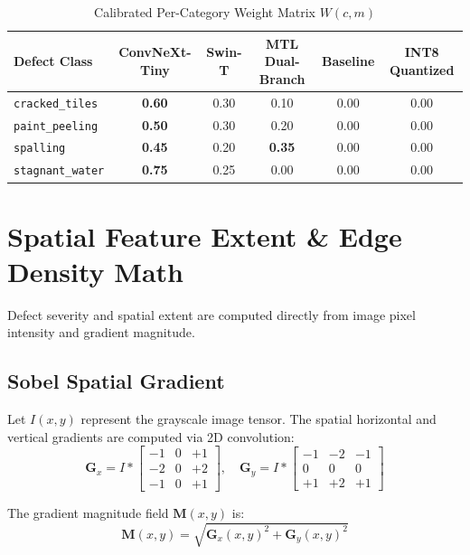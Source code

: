 \documentclass[11pt,a4paper]{article}
\begin{document}
\begin{table}[H]
\centering
\caption{Calibrated Per-Category Weight Matrix $W(c, m)$}
\label{tab:weights}
\begin{tabular}{lccccc}
\toprule
\textbf{Defect Class} & \textbf{ConvNeXt-Tiny} & \textbf{Swin-T} & \textbf{MTL Dual-Branch} & \textbf{Baseline} & \textbf{INT8 Quantized} \\
\midrule
\texttt{cracked\_tiles}  & \textbf{0.60} & 0.30 & 0.10 & 0.00 & 0.00 \\
\texttt{paint\_peeling}  & \textbf{0.50} & 0.30 & 0.20 & 0.00 & 0.00 \\
\texttt{spalling}       & \textbf{0.45} & 0.20 & \textbf{0.35} & 0.00 & 0.00 \\
\texttt{stagnant\_water} & \textbf{0.75} & 0.25 & 0.00 & 0.00 & 0.00 \\
\bottomrule
\end{tabular}
\end{table}

\section{Spatial Feature Extent \& Edge Density Math}

Defect severity and spatial extent are computed directly from image pixel intensity and gradient magnitude.

\subsection{Sobel Spatial Gradient}
Let $I(x, y)$ represent the grayscale image tensor. The spatial horizontal and vertical gradients are computed via 2D convolution:
\begin{equation}
\mathbf{G}_x = I * \begin{bmatrix} -1 & 0 & +1 \\ -2 & 0 & +2 \\ -1 & 0 & +1 \end{bmatrix}, \quad
\mathbf{G}_y = I * \begin{bmatrix} -1 & -2 & -1 \\ 0 & 0 & 0 \\ +1 & +2 & +1 \end{bmatrix}
\end{equation}

The gradient magnitude field $\mathbf{M}(x, y)$ is:
\begin{equation}
\mathbf{M}(x, y) = \sqrt{\mathbf{G}_x(x, y)^2 + \mathbf{G}_y(x, y)^2}
\end{equation}
\end{document}

